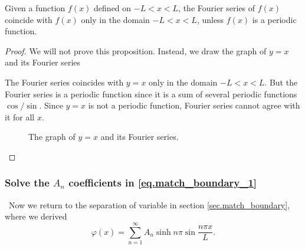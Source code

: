 \begin{proposition}[]
    Given a function $f(x)$ defined on $-L < x < L$, the Fourier series of $f(x)$ coincide with $f(x)$ only in the domain $-L < x < L$, unless $f(x)$ is a periodic function.
\end{proposition}
\begin{proof}
    We will not prove this proposition. Instead, we draw the graph of $y = x$ and its Fourier series

    The Fourier series coincides with $y = x$ only in the domain $-L < x < L$. But the Fourier series is a periodic function since it is a sum of several periodic functions $\cos/\sin$. Since $y = x$ is not a periodic function, Fourier series cannot agree with it for all $x$.
    \begin{figure}[H]
        \centering 
        \caption{The graph of $y = x$ and its Fourier series.} 
        \label{fig.fourier_x} 
    \end{figure}
\end{proof}


\subsubsection{Solve the $A_n$ coefficients in \eqref{eq.match_boundary_1}}\label{sec.A_n_coef_sep} 

\quad\, Now we return to the separation of variable in section \ref{sec.match_boundary}, where we derived
\begin{equation}\label{eq.match_boundary_1_repeat}
    \varphi(x) =\sum_{n = 1}^{\infty} A_n \sinh n \pi \sin \frac{n \pi x}{L}.
\end{equation}

